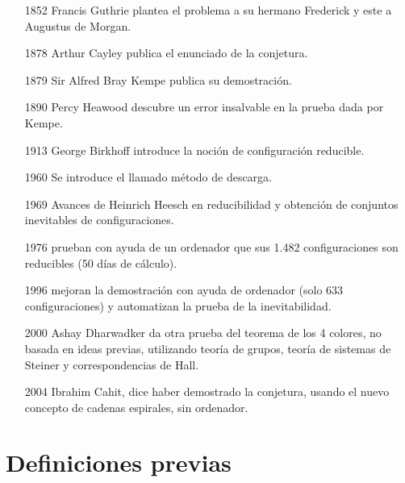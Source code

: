 \documentclass[3p,times,a4paper,twocolumn,authoryear]{elsarticle} %
\begin{document}
\begin{enumerate}
	
	\item[{\color{DarkBlue}1852}] Francis Guthrie plantea el problema a su hermano Frederick y este a Augustus de Morgan.
	
	\item[{\color{DarkBlue}1878}] Arthur Cayley publica el enunciado de la conjetura.
	
	\item[{\color{DarkBlue}1879}] Sir Alfred Bray Kempe publica su demostración.
	
	\item[{\color{DarkBlue}1890}] Percy Heawood descubre un error insalvable en la prueba dada por Kempe.
	
	\item[{\color{DarkBlue}1913}] George Birkhoff introduce la noción de configuración reducible.
	
	\item[{\color{DarkBlue}1960}] Se introduce el llamado método de descarga.
	
	\item[{\color{DarkBlue}1969}] Avances de Heinrich Heesch en reducibilidad y obtención de conjuntos inevitables de configuraciones.
	
	\item[{\color{DarkBlue}1976}] \citeauthor{appel} prueban con ayuda de un ordenador que sus 1.482 configuraciones son reducibles (50 días de cálculo).
	
	\item[{\color{DarkBlue}1996}] \citeauthor{robertson} mejoran la demostración con ayuda de ordenador (solo 633 configuraciones) y automatizan la prueba de la inevitabilidad.
	
	\item[{\color{DarkBlue}2000}] Ashay Dharwadker da otra prueba del teorema de los 4 colores, no basada en ideas previas, utilizando teoría de grupos, teoría de sistemas de Steiner y correspondencias de Hall.
	
	\item[{\color{DarkBlue}2004}] Ibrahim Cahit, dice haber demostrado la conjetura, usando el nuevo concepto de cadenas espirales, sin ordenador.

\end{enumerate}

\section{Definiciones previas}\label{sec:2}
\end{document}
